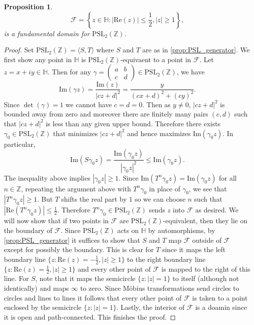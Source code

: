 \documentclass[12pt]{book}
\newtheorem{proposition}{Proposition}[section]
\theoremstyle{definition}\newframedtheorem{method}{Method}
\newcommand{\mc}{\mathcal}
\newcommand{\PSL}{\mathrm{PSL}}
\newcommand{\Z}{\mathbb{Z}}
\renewcommand{\H}{\mathbb{H}}
\newcommand{\g}{\gamma}
\newcommand{\<}{\langle}
\renewcommand{\>}{\rangle}
\renewcommand{\Re}{\mathrm{Re}}
\renewcommand{\Im}{\mathrm{Im}}
\begin{document}
      \begin{proposition}\label{prop:fundamental_domain_modular_group}
        \[
          \mc{F} = \left\{z \in \H:|\Re(z)| \le \frac{1}{2}, |z| \ge 1\right\},
        \]
        is a fundamental domain for $\PSL_{2}(\Z)$.
      \end{proposition}
      \begin{proof}
        Set $\PSL_{2}(\Z) = \<S,T\>$ where $S$ and $T$ are as in \cref{prop:PSL_generator}. We first show any point in $\H$ is $\PSL_{2}(\Z)$-equivaent to a point in $\mc{F}$. Let $z = x+iy \in \H$. Then for any $\g = \begin{pmatrix} a & b \\ c & d \end{pmatrix} \in \PSL_{2}(\Z)$, we have
        \[
          \Im(\g z) = \frac{\Im(z)}{|cz+d|^{2}} = \frac{y}{(cx+d)^{2}+(cy)^{2}}.
        \]
        Since $\det(\g) = 1$ we cannot have $c = d = 0$. Then as $y \neq 0$, $|cz+d|^{2}$ is bounded away from zero and moreover there are finitely many pairs $(c,d)$ such that $|cz+d|^{2}$ is less than any given upper bound. Therefore there exists $\g_{0} \in \PSL_{2}(\Z)$ that minimizes $|cz+d|^{2}$ and hence maximizes $\Im(\g_{0}z)$. In particular,
        \[
          \Im(S\g_{0}z) = \frac{\Im(\g_{0}z)}{|\g_{0}z|^{2}} \le \Im(\g_{0}z).
        \]
        The inequality above implies $|\g_{0}z| \ge 1$. Since $\Im(T^{n}\g_{0}z) = \Im(\g_{0}z)$ for all $n \in \Z$, repeating the argument above with $T^{n}\g_{0}$ in place of $\g_{0}$, we see that $|T^{n}\g_{0}z| \ge 1$. But $T$ shifts the real part by $1$ so we can choose $n$ such that $|\Re(T^{n}\g_{0}z)| \le \frac{1}{2}$. Therefore $T^{n}\g_{0} \in \PSL_{2}(\Z)$ sends $z$ into $\mc{F}$ as desired. We will now show that if two points in $\mc{F}$ are $\PSL_{2}(\Z)$-equivalent, then they lie on the boundary of $\mc{F}$. Since $\PSL_{2}(\Z)$ acts on $\H$ by automorphisms, by \cref{prop:PSL_generator} it suffices to show that $S$ and $T$ map $\mc{F}$ outside of $\mc{F}$ except for possibly the boundary. This is clear for $T$ since it maps the left boundary line $\{z:\Re(z) = -\frac{1}{2},|z| \ge 1\}$ to the right boundary line $\{z:\Re(z) = \frac{1}{2},|z| \ge 1\}$ and every other point of $\mc{F}$ is mapped to the right of this line. For $S$, note that it maps the semicircle $\{z:|z| = 1\}$ to itself (although not identically) and maps $\infty$ to zero. Since M\"obius transformations send circles to circles and lines to lines it follows that every other point of $\mc{F}$ is taken to a point enclosed by the semicircle $\{z:|z| = 1\}$. Lastly, the interior of $\mc{F}$ is a doamin since it is open and path-connected. This finishes the proof.
      \end{proof}
\end{document}
